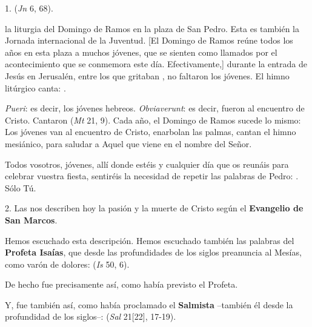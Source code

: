 \begin{body}
1.  (\textit{Jn} 6, 68).

 la liturgia del Domingo de Ramos en la plaza de San Pedro. Esta es también la Jornada internacional de la Juventud. [El Domingo de Ramos reúne todos los años en esta plaza a muchos jóvenes, que se sienten como llamados por el acontecimiento que se conmemora este día. Efectivamente,] durante la entrada de Jesús en Jerusalén, entre los que gritaban , no faltaron los jóvenes. El himno litúrgico canta: .

\textit{Pueri}: es decir, los jóvenes hebreos. \textit{Obviaverunt}: es decir, fueron al encuentro de Cristo. Cantaron  (\textit{Mt} 21, 9). Cada año, el Domingo de Ramos sucede lo mismo: Los jóvenes van al encuentro de Cristo, enarbolan las palmas, cantan el himno mesiánico, para saludar a Aquel que viene en el nombre del Señor. 

Todos vosotros, jóvenes, allí donde estéis y cualquier día que os reunáis para celebrar vuestra fiesta, sentiréis la necesidad de repetir las palabras de Pedro: . Sólo Tú.

2. Las  nos describen hoy la pasión y la muerte de Cristo según el \textbf{Evangelio de San Marcos}.

Hemos escuchado esta descripción. Hemos escuchado también las palabras del \textbf{Profeta Isaías}, que desde las profundidades de los siglos preanuncia al Mesías, como varón de dolores:  (\textit{Is} 50, 6).

De hecho fue precisamente así, como había previsto el Profeta.

Y, fue también así, como había proclamado el \textbf{Salmista} –también él desde la profundidad de los siglos–:  (\textit{Sal} 21[22], 17-19).


\end{body}
